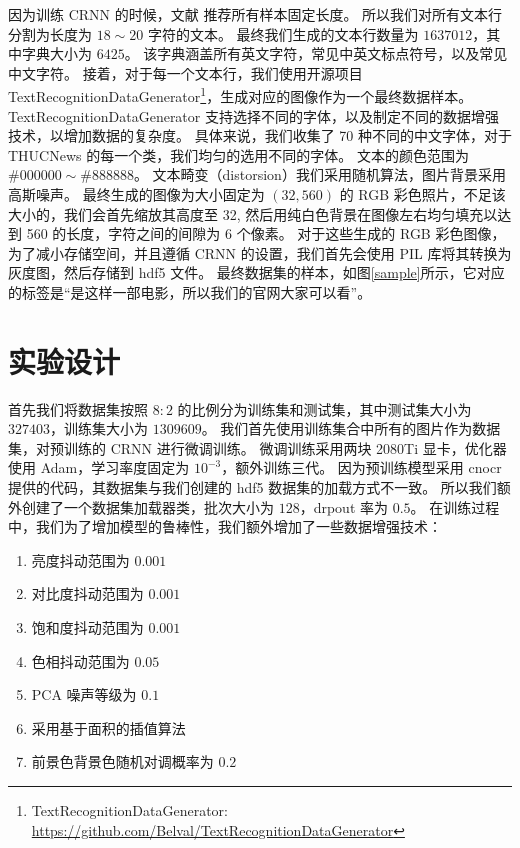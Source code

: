 因为训练 CRNN 的时候，文献\cite{CRNN} 推荐所有样本固定长度。
所以我们对所有文本行分割为长度为 $18 \sim 20$ 字符的文本。
最终我们生成的文本行数量为 $1637012$，其中字典大小为 $6425$。
该字典涵盖所有英文字符，常见中英文标点符号，以及常见中文字符。
接着，对于每一个文本行，我们使用开源项目 TextRecognitionDataGenerator\footnote{TextRecognitionDataGenerator: \url{https://github.com/Belval/TextRecognitionDataGenerator}}，生成对应的图像作为一个最终数据样本。
TextRecognitionDataGenerator 支持选择不同的字体，以及制定不同的数据增强技术，以增加数据的复杂度。
具体来说，我们收集了 70 种不同的中文字体，对于 THUCNews 的每一个类，我们均匀的选用不同的字体。
文本的颜色范围为 $\#000000 \sim \#888888$。
文本畸变（distorsion）我们采用随机算法，图片背景采用高斯噪声。
最终生成的图像为大小固定为 $(32, 560)$ 的 RGB 彩色照片，不足该大小的，我们会首先缩放其高度至 32, 然后用纯白色背景在图像左右均匀填充以达到 560 的长度，字符之间的间隙为 6 个像素。
对于这些生成的 RGB 彩色图像，为了减小存储空间，并且遵循 CRNN\cite{CRNN} 的设置，我们首先会使用 PIL 库将其转换为灰度图，然后存储到 hdf5 文件。
最终数据集的样本，如图\ref{sample}所示，它对应的标签是“是这样一部电影，所以我们的官网大家可以看”。

\section{实验设计}
\label{exp_design}
首先我们将数据集按照 $8:2$ 的比例分为训练集和测试集，其中测试集大小为 $327403$，训练集大小为 $1309609$。
我们首先使用训练集合中所有的图片作为数据集，对预训练的 CRNN 进行微调训练。
微调训练采用两块 2080Ti 显卡，优化器使用 Adam，学习率度固定为 $10^{-3}$，额外训练三代。
因为预训练模型采用 cnocr 提供的代码，其数据集与我们创建的 hdf5 数据集的加载方式不一致。
所以我们额外创建了一个数据集加载器类，批次大小为 $128$，drpout 率为 $0.5$。
在训练过程中，我们为了增加模型的鲁棒性，我们额外增加了一些数据增强技术：

\begin{enumerate}[(1)]
	\item 亮度抖动范围为 $0.001$
	\item 对比度抖动范围为 $0.001$
	\item 饱和度抖动范围为 $0.001$
	\item 色相抖动范围为 $0.05$
	\item PCA 噪声等级为 $0.1$
	\item 采用基于面积的插值算法
	\item 前景色背景色随机对调概率为 $0.2$
\end{enumerate}

